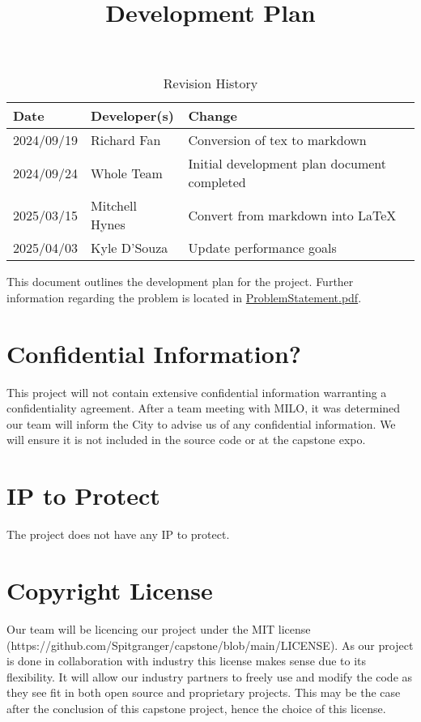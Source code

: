 \documentclass{article}
\title{Development Plan\\\progname}
\author{\authname}
\date{}
\begin{document}
\maketitle

\begin{table}[hp]
  \caption{Revision History} \label{TblRevisionHistory}
  \begin{tabularx}{\textwidth}{llX}
    \toprule
    \textbf{Date} & \textbf{Developer(s)} & \textbf{Change}\\
    \midrule
    2024/09/19 & Richard Fan & Conversion of tex to markdown\\
    2024/09/24 & Whole Team & Initial development plan document completed\\
    2025/03/15 & Mitchell Hynes & Convert from markdown into \LaTeX \\
    2025/04/03 & Kyle D'Souza & Update performance goals \\
    \bottomrule
  \end{tabularx}
\end{table}

\newpage{}

This document outlines the development plan for the project. Further
information regarding the problem is
located in
\href{https://github.com/Spitgranger/SyncMaster/blob/main/docs/ProblemStatementAndGoals/ProblemStatement.pdf}{ProblemStatement.pdf}.

\section{Confidential Information?}

This project will not contain extensive confidential information
warranting a confidentiality agreement. After a
team meeting with MILO, it was determined our team will inform the
City to advise us of any confidential
information. We will ensure it is not included in the source code or
at the capstone expo.

\section{IP to Protect}

The project does not have any IP to protect.

\section{Copyright License}

Our team will be licencing our project under the MIT license\\
(https://github.com/Spitgranger/capstone/blob/main/LICENSE).
As our project is done in collaboration with
industry this license makes sense due to its flexibility. It will
allow our industry partners to freely use and
modify the code as they see fit in both open source and proprietary
projects. This may be the case after the
conclusion of this capstone project, hence the choice of this license.
\end{document}
